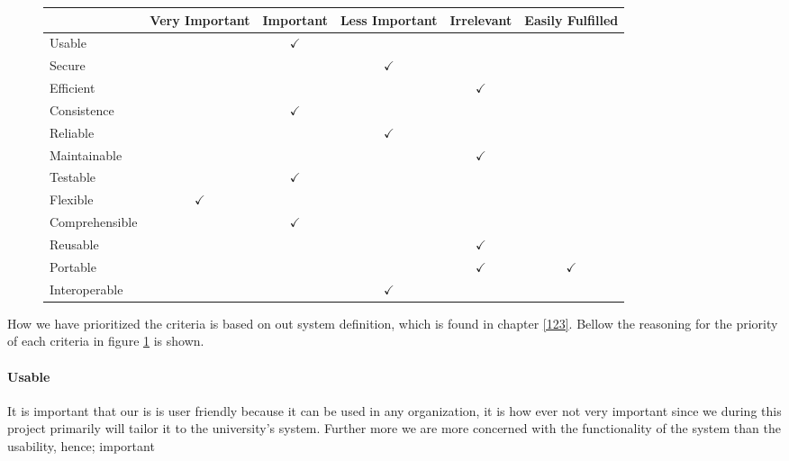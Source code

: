 \begin{figure}[htbp]
	\centering
		\begin{tabular}{| l | m{} | m{}| m{}| m{}|m{}|} \hline
		  & Very  Important & Important & Less Important & Irrelevant & Easily Fulfilled \\ \hline
		Usable  & & \multicolumn{1}{c|}{$\checkmark$} & & & \\ \hline
		Secure  & & & \multicolumn{1}{c|}{$\checkmark$} & & \\ \hline
		Efficient & & & & \multicolumn{1}{c|}{$\checkmark$} & \\ \hline
		Consistence  & & \multicolumn{1}{c|}{$\checkmark$} & & & \\ \hline
		Reliable  & & & \multicolumn{1}{c|}{$\checkmark$} & & \\ \hline
		Maintainable  & & & & \multicolumn{1}{c|}{$\checkmark$} & \\ \hline
		Testable  & & \multicolumn{1}{c|}{$\checkmark$} & & & \\ \hline
		Flexible  & \multicolumn{1}{c|}{$\checkmark$} & & & & \\ \hline
		Comprehensible  & & \multicolumn{1}{c|}{$\checkmark$} & & & \\ \hline
		Reusable  & & & & \multicolumn{1}{c|}{$\checkmark$} & \\ \hline
		Portable & & & & \multicolumn{1}{c|}{$\checkmark$} & \multicolumn{1}{c|}{$\checkmark$} \\ \hline
		Interoperable & & & \multicolumn{1}{c|}{$\checkmark$} & & \\ \hline
		\end{tabular}
	\label{fig:prioritizedCrit}
\end{figure}

How we have prioritized the criteria is based on out system definition, which is found in chapter \ref{123}. Bellow the reasoning for the priority of each criteria in figure \ref{fig:prioritizedCrit} is shown.

\paragraph{Usable}
It is important that our \hdesk[] is is user friendly because it can be used in any organization, it is how ever not very important since we during this project primarily will tailor it to the university's system.
Further more we are more concerned with the functionality of the system than the usability, hence; important 
